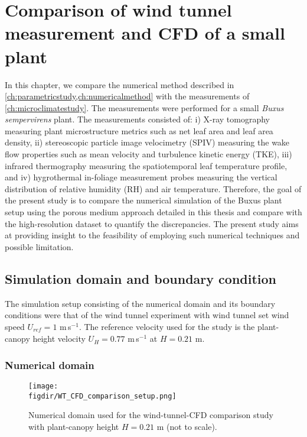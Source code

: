\chapter{Comparison of wind tunnel measurement and CFD of a small plant}
\label{ch:wtcfdcomparison}
\def\figdir{chapters/ch06_wtcfdcomparison/figures}	


In this chapter, we compare the numerical method described in \cref{ch:parametricstudy,ch:numericalmethod} with the measurements of \cref{ch:microclimatestudy}. The measurements were performed for a small \textit{Buxus} \textit{sempervirens} plant. The measurements consisted of: i) X-ray tomography measuring plant microstructure metrics such as net leaf area and leaf area density, ii) stereoscopic particle image velocimetry (SPIV) measuring the wake flow properties such as mean velocity and turbulence kinetic energy (TKE), iii) infrared thermography measuring the spatiotemporal leaf temperature profile, and iv) hygrothermal in-foliage measurement probes measuring the vertical distribution of relative humidity (RH) and air temperature. Therefore, the goal of the present study is to compare the numerical simulation of the Buxus plant setup using the porous medium approach detailed in this thesis and compare with the high-resolution dataset to quantify the discrepancies. The present study aims at providing insight to the feasibility of employing such numerical techniques and possible limitation.

\section{Simulation domain and boundary condition}

The simulation setup consisting of the numerical domain and its boundary conditions were that of the wind tunnel experiment with wind tunnel set wind speed $U_{\textit{ref}} = 1$ m\,s$^{-1}$. The reference velocity used for the study is the plant-canopy height velocity $U_H = 0.77$ m\,s$^{-1}$ at $H = 0.21$ m.

\subsection{Numerical domain}
	
	\begin{figure}[t]
		\centering
		\texttt{[image: \\figdir/WT\_CFD\_comparison\_setup.png]}
		\caption{Numerical domain used for the wind-tunnel-CFD comparison study with plant-canopy height $H = 0.21$ m (not to scale).}
		\label{fig:WT_CFD_comparison_setup}
	\end{figure}

